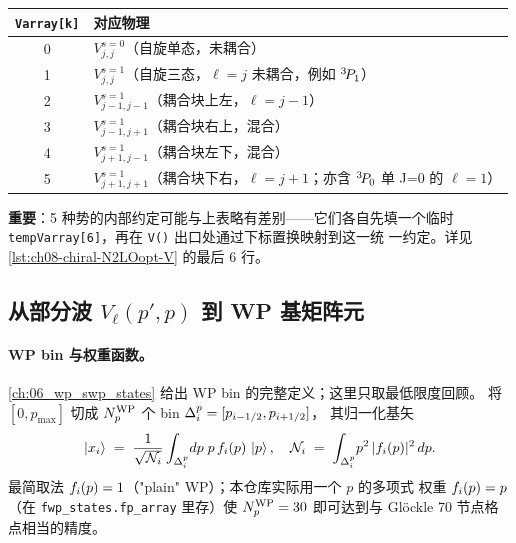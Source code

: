 \begin{center}
\begin{tabular}{cl}
\toprule
\texttt{Varray[k]} & 对应物理 \\
\midrule
0 & \(V^{s=0}_{j, j}\)（自旋单态，未耦合） \\
1 & \(V^{s=1}_{j, j}\)（自旋三态，\(\ell = j\) 未耦合，例如 \({}^{3}\!P_{1}\)） \\
2 & \(V^{s=1}_{j-1, j-1}\)（耦合块上左，\(\ell = j-1\)） \\
3 & \(V^{s=1}_{j-1, j+1}\)（耦合块右上，混合） \\
4 & \(V^{s=1}_{j+1, j-1}\)（耦合块左下，混合） \\
5 & \(V^{s=1}_{j+1, j+1}\)（耦合块下右，\(\ell = j+1\)；亦含 \({}^{3}\!P_{0}\) 单 J=0 的 \(\ell=1\)） \\
\bottomrule
\end{tabular}
\end{center}

\textbf{重要}：5 种势的内部约定可能与上表略有差别——它们各自先填一个临时
\texttt{tempVarray[6]}，再在 \texttt{V()} 出口处通过下标置换映射到这一统
一约定。详见 \cref{lst:ch08-chiral-N2LOopt-V} 的最后 6 行。

\subsection{从部分波 \(V_\ell(p', p)\) 到 WP 基矩阵元}
\label{subsec:ch08-pw-to-WP}

\paragraph{WP bin 与权重函数。}
\cref{ch:06_wp_swp_states} 给出 WP bin 的完整定义；这里只取最低限度回顾。
将 \([0, p_{\max}]\) 切成 \({N_{p}^{\text{WP}}}\) 个 bin \(\Delta_{i}^{p} = [p_{i-1/2}, p_{i+1/2}]\)，
其归一化基矢
\begin{equation}
\label{eq:ch08-WP-basis}
\ket{x_{i}} \;=\; \frac{1}{\sqrt{\mathcal{N}_i}} \int_{\Delta_{i}^{p}}\! dp\; p\, f_i(p)\, \ket{p},
\quad
\mathcal{N}_i \;=\; \int_{\Delta_{i}^{p}}\! p^2\, |f_i(p)|^2\, dp.
\end{equation}
最简取法 \(f_i(p) = 1\)（"plain" WP）；本仓库实际用一个 \(p\) 的多项式
权重 \(f_i(p) = p\)（在 \texttt{fwp\_states.fp\_array} 里存）使
\({N_{p}^{\text{WP}}}=30\) 即可达到与 Glöckle 70 节点格点相当的精度。

